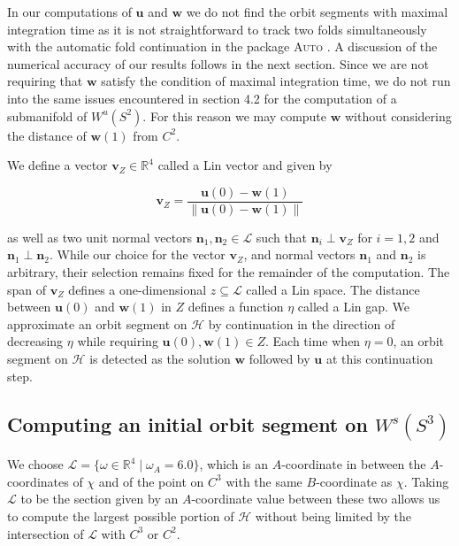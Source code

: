 \documentclass{ws-ijbc}
\begin{document}
In our computations of $\mathbf{u}$ and $\mathbf{w}$ we do not find the orbit segments with maximal integration time as it is not straightforward to track two folds simultaneously with the automatic fold continuation in the package \textsc{Auto} \cite{AUTO}.  A discussion of the numerical accuracy of our results follows in the next section.  Since we are not requiring that $\mathbf{w}$ satisfy the condition of maximal integration time, we do not run into the same issues encountered in section 4.2 for the computation of a submanifold of $W^u(S^2)$.  For this reason we may compute $\mathbf{w}$ without considering the distance of $\mathbf{w}(1)$ from $C^2$.

We define a vector $\mathbf{v}_Z \in \mathbb{R}^4$ called a Lin vector and given by 

	\begin{equation}
		\mathbf{v}_Z = \frac{\mathbf{u}(0) - \mathbf{w}(1)}{\left\lVert \mathbf{u}(0) - \mathbf{w}(1) \right\lVert}
		\label{Lin_vector}
	\end{equation}
	
\noindent	
as well as two unit normal vectors $\mathbf{n}_1, \mathbf{n}_2 \in \mathscr{L}$ such that $\mathbf{n}_i \perp \mathbf{v}_Z$ for $i=1,2$ and $\mathbf{n}_1 \perp \mathbf{n}_2$.  While our choice for the vector $\mathbf{v}_Z$, and normal vectors $\mathbf{n}_1$ and $\mathbf{n}_2$ is arbitrary, their selection remains fixed for the remainder of the computation.  The span of $\mathbf{v}_Z$ defines a one-dimensional $z \subseteq \mathscr{L}$ called a Lin space.  The distance between $\mathbf{u}(0)$ and $\mathbf{w}(1)$ in $Z$ defines a function $\eta$ called a Lin gap.  We approximate an orbit segment on $\mathscr{H}$ by continuation in the direction of decreasing $\eta$ while requiring $\mathbf{u}(0), \mathbf{w}(1) \in Z$.  Each time when  $\eta = 0$, an orbit segment on $\mathscr{H}$ is detected as the solution $\mathbf{w}$ followed by $\mathbf{u}$ at this continuation step.

\subsection{Computing an initial orbit segment on $W^s(S^3)$}

We choose $\mathscr{L} = \{\omega \in \mathbb{R}^4 \; | \; \omega_A = 6.0\}$, which is an $A$-coordinate in between the $A$-coordinates of $\chi$ and of the point on $C^3$ with the same $B$-coordinate as $\chi$.  Taking $\mathscr{L}$ to be the section given by an $A$-coordinate value between these two allows us to compute the largest possible portion of $\mathscr{H}$ without being limited by the intersection of $\mathscr{L}$ with $C^3$ or $C^2$.
\end{document}
